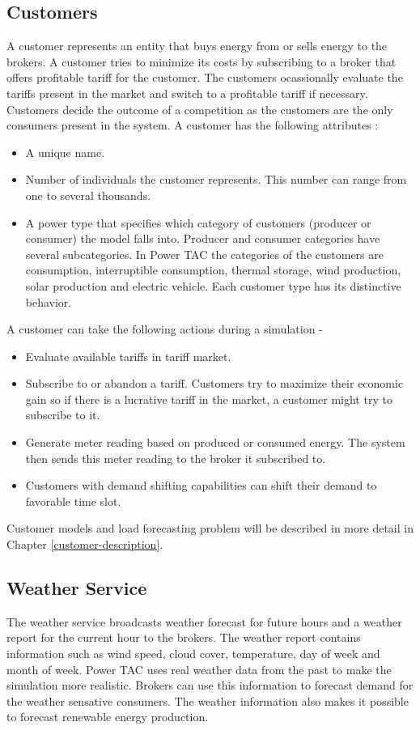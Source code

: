 \subsection{Customers}
A customer represents an entity that buys energy from or sells energy to the brokers. A customer tries to minimize its costs by subscribing to a broker that offers profitable tariff for the customer. The customers ocassionally evaluate the tariffs present in the market and switch to a profitable tariff if necessary. Customers decide the outcome of a competition as the customers are the only consumers present in the system. A customer has the following attributes :
\begin{itemize}  
\item A unique name. 
\item Number of individuals the customer represents. This number can range from one to several thousands. 
\item A power type that specifies which category of customers (producer or consumer) the model falls into. Producer and consumer categories have several subcategories. In Power TAC the categories of the customers are consumption, interruptible consumption, thermal storage, wind production, solar production and electric vehicle. Each customer type has its distinctive behavior. 
\end{itemize}

A customer can take the following actions during a simulation - 
\begin{itemize}  
\item Evaluate available tariffs in tariff market.
\item Subscribe to or abandon a tariff. Customers try to maximize their economic gain so if there is a lucrative tariff in the market, a customer might try to subscribe to it.
\item Generate meter reading based on produced or consumed energy. The system then sends this meter reading to the broker it subscribed to. 
\item Customers with demand shifting capabilities can shift their demand to favorable time slot.
\end{itemize}
 
Customer models and load forecasting problem will be described in more detail in Chapter \ref{customer-description}.
\subsection{Weather Service}
The weather service broadcasts weather forecast for future hours and a weather report for the current hour to the brokers. The weather report contains information such as wind speed, cloud cover, temperature, day of week and month of week. Power TAC uses real weather data from the past to make the simulation more realistic. Brokers can use this information to forecast demand for the weather sensative consumers. The weather information also makes it possible to forecast renewable energy production.



